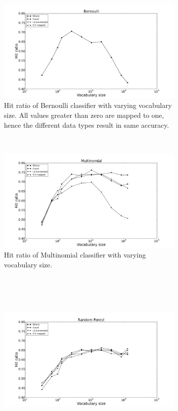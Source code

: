 \newcommand{\figwidth}{0.49\textwidth}
\begin{figure}[H]
	\centering
	\begin{subfigure}[b]{\figwidth}
		\includegraphics[width=\textwidth]{img/Bernoulli-hitrate-eps-converted-to.pdf}
		\caption{Hit ratio of Bernoulli classifier with varying vocabulary size. All values greater than zero are mapped to one, hence the different data types result in same accuracy.}
		\label{fig:hitratio-nb}
	\end{subfigure}
	~
	\begin{subfigure}[b]{\figwidth}
		\includegraphics[width=\textwidth]{img/Multinomial-hitrate-eps-converted-to.pdf}
		\caption{Hit ratio of Multinomial classifier with varying vocabulary size.\\\ \\\ }
		\label{fig:hitratio-mn}
	\end{subfigure}
	\\
	\begin{subfigure}[b]{\figwidth}
		\includegraphics[width=\textwidth]{img/Random-Forest-hitrate-eps-converted-to.pdf}

\end{subfigure}
\end{figure}
